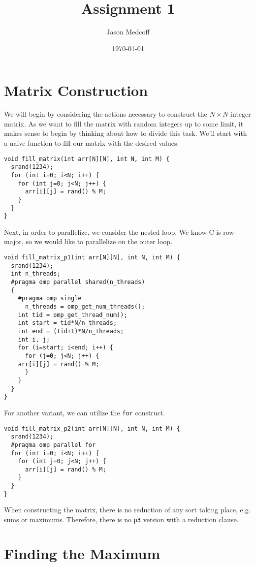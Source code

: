 \documentclass[11pt]{article}
\author{Jason Medcoff}
\date{\today}
\title{Assignment 1}
\begin{document}
\maketitle

\section{Matrix Construction}
\label{sec-1}

We will begin by considering the actions necessary to construct the $N
\times N$ integer matrix. As we want to fill the matrix with random
integers up to some limit, it makes sense to begin by thinking about
how to divide this task. We'll start with a naive function to fill our
matrix with the desired values.

\begin{verbatim}
void fill_matrix(int arr[N][N], int N, int M) {
  srand(1234);
  for (int i=0; i<N; i++) {
    for (int j=0; j<N; j++) {
      arr[i][j] = rand() % M;
    }
  }
}
\end{verbatim}

Next, in order to parallelize, we consider the nested loop. We know C
is row-major, so we would like to parallelize on the outer loop.

\begin{verbatim}
void fill_matrix_p1(int arr[N][N], int N, int M) {
  srand(1234);
  int n_threads;
  #pragma omp parallel shared(n_threads)
  {
    #pragma omp single
      n_threads = omp_get_num_threads();
    int tid = omp_get_thread_num();
    int start = tid*N/n_threads;
    int end = (tid+1)*N/n_threads;
    int i, j;
    for (i=start; i<end; i++) {
      for (j=0; j<N; j++) {
	arr[i][j] = rand() % M;
      }
    }
  }
}
\end{verbatim}

For another variant, we can utilize the \verb~for~ construct.

\begin{verbatim}
void fill_matrix_p2(int arr[N][N], int N, int M) {
  srand(1234);
  #pragma omp parallel for
  for (int i=0; i<N; i++) {
    for (int j=0; j<N; j++) {
      arr[i][j] = rand() % M;
    }
  }
}
\end{verbatim}

When constructing the matrix, there is no reduction of any sort taking
place, e.g. sums or maximums. Therefore, there is no \verb~p3~ version with
a reduction clause.

\section{Finding the Maximum}
\label{sec-2}
\end{document}
